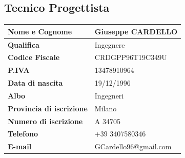 \subsection{Tecnico Progettista}
\begin{center}
\begin{tabular}{|p{6.5cm}|p{7cm}|}
\hline
\textbf{Nome e Cognome} & Giuseppe CARDELLO \\
\hline
\textbf{Qualifica} & Ingegnere \\
\hline
\textbf{Codice Fiscale} & CRDGPP96T19C349U \\
\hline
\textbf{P.IVA} & 13478910964 \\
\hline
\textbf{Data di nascita} & 19/12/1996 \\
\hline
\textbf{Albo} & Ingegneri \\
\hline
\textbf{Provincia di iscrizione} & Milano \\
\hline
\textbf{Numero di iscrizione} & A 34705 \\
\hline
\textbf{Telefono} & +39 3407580346 \\
\hline
\textbf{E-mail} & GCardello96@gmail.com \\
\hline
\end{tabular}
\end{center}